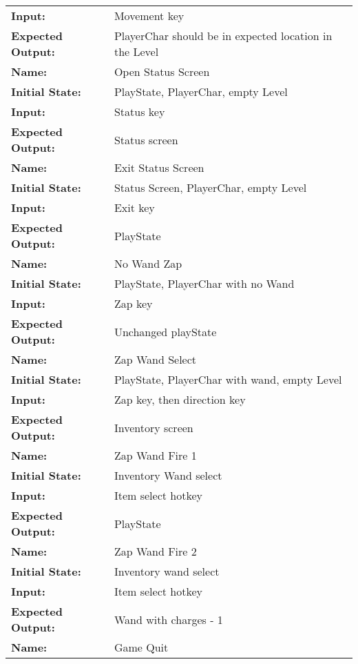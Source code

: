 \documentclass[12pt, titlepage]{article}
\begin{document}
\begin{center}
\begin{longtable}{ l | p{10cm} }
				\textbf{Input:} & Movement key\\
				\textbf{Expected Output:} & PlayerChar should be in expected location in the Level\\[0.6em]
				\hline
				\rule{0pt}{1.5em}\textbf{Name:} & Open Status Screen\\
				\textbf{Initial State:} & PlayState, PlayerChar, empty Level\\
				\textbf{Input:} & Status key\\
				\textbf{Expected Output:} & Status screen\\[0.6em]
				\hline
				\rule{0pt}{1.5em}\textbf{Name:} & Exit Status Screen\\
				\textbf{Initial State:} & Status Screen, PlayerChar, empty Level\\
				\textbf{Input:} & Exit key\\
				\textbf{Expected Output:} & PlayState\\[0.6em]
				\hline
				\rule{0pt}{1.5em}\textbf{Name:} & No Wand Zap\\
				\textbf{Initial State:} & PlayState, PlayerChar with no Wand\\
				\textbf{Input:} & Zap key\\
				\textbf{Expected Output:} & Unchanged playState\\[0.6em]
				\hline
				\rule{0pt}{1.5em}\textbf{Name:} & Zap Wand Select\\
				\textbf{Initial State:} & PlayState, PlayerChar with wand, empty Level \\
				\textbf{Input:} & Zap key, then direction key\\
				\textbf{Expected Output:} & Inventory screen\\[0.6em]
				\hline
				\rule{0pt}{1.5em}\textbf{Name:} & Zap Wand Fire 1\\
				\textbf{Initial State:} & Inventory Wand select\\
				\textbf{Input:} & Item select hotkey\\
				\textbf{Expected Output:} & PlayState\\[0.6em]
				\hline
				\rule{0pt}{1.5em}\textbf{Name:} & Zap Wand Fire 2\\
				\textbf{Initial State:} & Inventory wand select\\
				\textbf{Input:} & Item select hotkey\\
				\textbf{Expected Output:} & Wand with charges - 1\\[0.6em]
				\hline
				\rule{0pt}{1.5em}\textbf{Name:} & Game Quit\\

\end{longtable}
\end{center}
\end{document}
